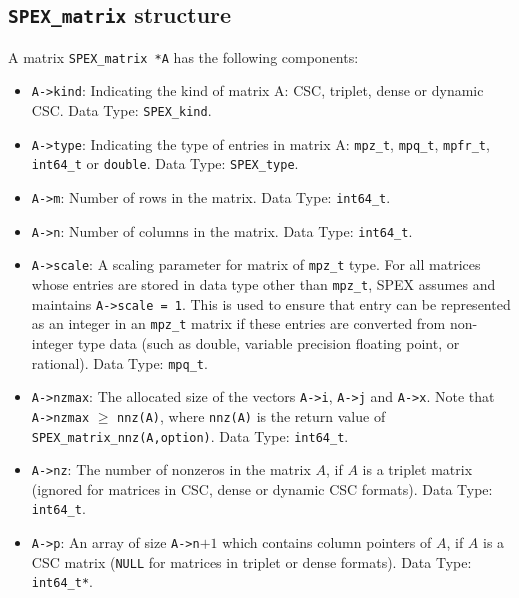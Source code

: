 \documentclass[12pt,oneside]{book}
\theoremstyle{definition}
\begin{document}
\subsection{\texttt{SPEX\_matrix} structure}
A matrix \verb|SPEX_matrix *A| has the following components:

\begin{itemize}
    \item \verb|A->kind|: Indicating the kind of matrix A: CSC, triplet, dense or dynamic CSC. Data Type: \verb|SPEX_kind|.

    \item \verb|A->type|: Indicating the type of entries in matrix A: \verb|mpz_t|, \verb|mpq_t|, \verb|mpfr_t|, \verb|int64_t| or \verb|double|. Data Type: \verb|SPEX_type|.

    \item \verb|A->m|: Number of rows in the matrix. Data Type: \verb|int64_t|.

    \item \verb|A->n|: Number of columns in the matrix. Data Type: \verb|int64_t|.

    \item \verb|A->scale|: A scaling parameter for matrix of \verb|mpz_t| type. For all matrices whose entries are stored in data type other than \verb|mpz_t|, SPEX assumes and maintains \verb|A->scale = 1|. This is used to ensure that entry can be represented as an integer in an \verb|mpz_t| matrix if these entries are converted from non-integer type data (such as double, variable precision floating point, or rational). Data Type: \verb|mpq_t|.

    \item \verb|A->nzmax|: The allocated size of the vectors \verb|A->i|, \verb|A->j| and \verb|A->x|. Note that \verb|A->nzmax| $\geq$ \verb|nnz(A)|, where \verb|nnz(A)| is the return value of \verb|SPEX_matrix_nnz(A,option)|. Data Type: \verb|int64_t|.

    \item \verb|A->nz|: The number of nonzeros in the matrix $A$, if $A$ is a triplet matrix (ignored for matrices in CSC, dense or dynamic CSC formats). Data Type: \verb|int64_t|.

    \item \verb|A->p|: An array of size \verb|A->n|$+1$ which contains column pointers of $A$, if $A$ is a CSC matrix (\verb|NULL| for matrices in triplet or dense formats). Data Type: \verb|int64_t*|.


\end{itemize}
\end{document}

